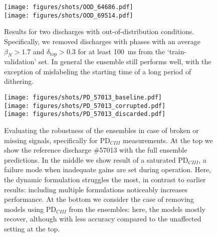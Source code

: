 \begin{figure}[h]
\begin{center}\texttt{[image: figures/shots/OOD\_64686.pdf]}\\\texttt{[image: figures/shots/OOD\_69514.pdf]}\end{center}
    \caption{Results for two discharges with out-of-distribution conditions. Specifically, we removed discharges with phases with an average $\beta_N > 1.7$ and $\delta_{\text{top}} > 0.3$ for at least \SI{100}{\milli\second} from the `train-validation' set. In general the ensemble still performs well, with the exception of mislabeling the starting time of a long period of dithering.}
    \label{fig:s_betan}%
\end{figure}

\begin{figure}[t]
\begin{center}\texttt{[image: figures/shots/PD\_57013\_baseline.pdf]}\\\texttt{[image: figures/shots/PD\_57013\_corrupted.pdf]}\\\texttt{[image: figures/shots/PD\_57013\_discarded.pdf]}
\end{center}
    \caption{Evaluating the robustness of the ensembles in case of broken or missing signals, specifically for $\text{PD}_{\textit{CIII}}^{}$ measurements. At the top we show the reference discharge \#57013 with the full ensemble predictions. In the middle we show result of a saturated $\text{PD}_{\textit{CIII}}^{}$, a failure mode when inadequate gains are set during operation. Here, the dynamic formulation struggles the most, in contrast to earlier results: including multiple formulations noticeably increases performance. At the bottom we consider the case of removing models using $\text{PD}_{\textit{CIII}}^{}$ from the ensembles: here, the models mostly recover, although with less accuracy compared to the unaffected setting at the top.}
    \label{fig:pdsat}%
\end{figure}


